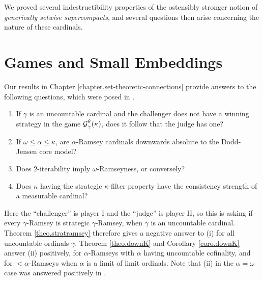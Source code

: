 \documentclass[../../main]{subfiles}
\begin{document}
We proved several indestructibility properties of the ostensibly stronger notion of \textit{generically setwise supercompacts}, and several questions then arise concerning the nature of these cardinals.






\section{Games and Small Embeddings}

Our results in Chapter \ref{chapter.set-theoretic-connections} provide answers to the following questions, which were posed in \cite{HolySchlicht}.

\begin{enumerate}
	\item If $\gamma$ is an uncountable cardinal and the challenger does not have a winning strategy in the game $\operatorname{\mathcal G}_\gamma^\theta(\kappa)$, does it follow that the judge has one?
	\item If $\omega\leq\alpha\leq\kappa$, are $\alpha$-Ramsey cardinals downwards absolute to the Dodd-Jensen core model?
	\item Does $2$-iterability imply $\omega$-Ramseyness, or conversely?
	\item Does $\kappa$ having the strategic $\kappa$-filter property have the consistency strength of a measurable cardinal?\\
\end{enumerate}

Here the ``challenger'' is player I and the ``judge'' is player II, so this is asking if every $\gamma$-Ramsey is strategic $\gamma$-Ramsey, when $\gamma$ is an uncountable cardinal. Theorem \ref{theo.stratramsey} therefore gives a negative answer to (i) for all uncountable ordinals $\gamma$. Theorem \ref{theo.downK} and Corollary \ref{coro.downK} answer (ii) positively, for $\alpha$-Ramseys with $\alpha$ having uncountable cofinality, and for ${<}\alpha$-Ramseys when $\alpha$ is a limit of limit ordinals. Note that (ii) in the $\alpha=\omega$ case was answered positively in \cite{HolySchlicht}.
\end{document}
